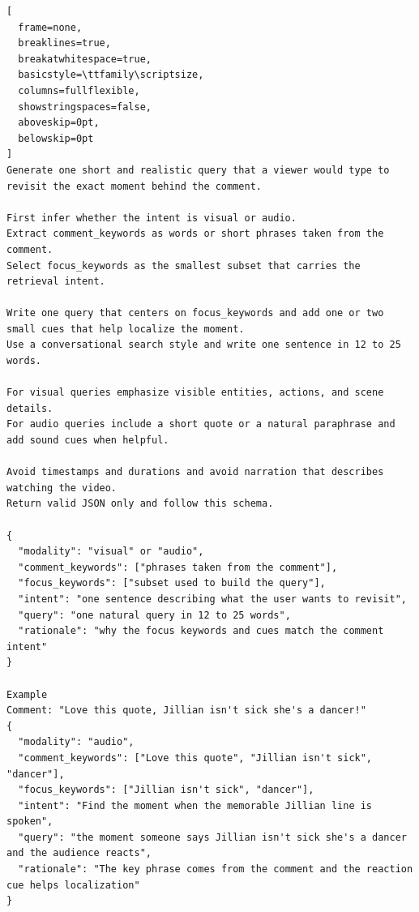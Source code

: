 \begin{tcolorbox}[
  colback=blue!3!white,
  colframe=blue!70!black,
  width=\linewidth,
  arc=1mm,
  boxrule=0.45pt,
  boxsep=0.8mm,
  left=1.6mm,
  right=1.6mm,
  top=1.2mm,
  bottom=1.2mm,
  title=\textbf{Moment Search Query Generation},
  colbacktitle=blue!70!black,
  coltitle=white,
  fonttitle=\scriptsize\bfseries\sffamily,
  halign title=center
]
\setlength{\parindent}{0pt}
\begin{lstlisting}[
  frame=none,
  breaklines=true,
  breakatwhitespace=true,
  basicstyle=\ttfamily\scriptsize,
  columns=fullflexible,
  showstringspaces=false,
  aboveskip=0pt,
  belowskip=0pt
]
Generate one short and realistic query that a viewer would type to revisit the exact moment behind the comment.

First infer whether the intent is visual or audio.
Extract comment_keywords as words or short phrases taken from the comment.
Select focus_keywords as the smallest subset that carries the retrieval intent.

Write one query that centers on focus_keywords and add one or two small cues that help localize the moment.
Use a conversational search style and write one sentence in 12 to 25 words.

For visual queries emphasize visible entities, actions, and scene details.
For audio queries include a short quote or a natural paraphrase and add sound cues when helpful.

Avoid timestamps and durations and avoid narration that describes watching the video.
Return valid JSON only and follow this schema.

{
  "modality": "visual" or "audio",
  "comment_keywords": ["phrases taken from the comment"],
  "focus_keywords": ["subset used to build the query"],
  "intent": "one sentence describing what the user wants to revisit",
  "query": "one natural query in 12 to 25 words",
  "rationale": "why the focus keywords and cues match the comment intent"
}

Example
Comment: "Love this quote, Jillian isn't sick she's a dancer!"
{
  "modality": "audio",
  "comment_keywords": ["Love this quote", "Jillian isn't sick", "dancer"],
  "focus_keywords": ["Jillian isn't sick", "dancer"],
  "intent": "Find the moment when the memorable Jillian line is spoken",
  "query": "the moment someone says Jillian isn't sick she's a dancer and the audience reacts",
  "rationale": "The key phrase comes from the comment and the reaction cue helps localization"
}
\end{lstlisting}
\end{tcolorbox}
